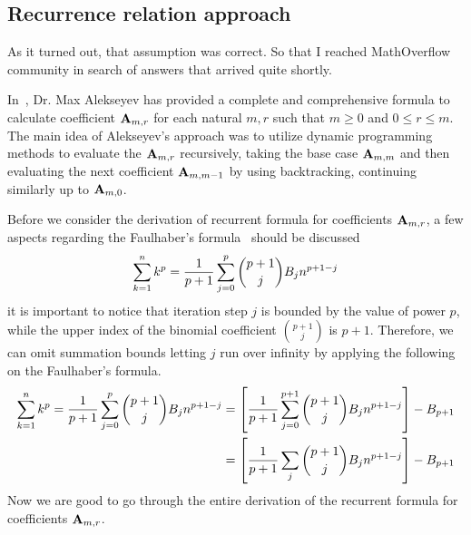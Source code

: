 \subsection{Recurrence relation approach}\label{subsec:recurrence-relation-approach}
As it turned out, that assumption was correct.
So that I reached MathOverflow community in search of answers that arrived quite shortly.

In~\cite{alekseyev2018mathoverflow}, Dr. Max Alekseyev has provided a complete and comprehensive formula to calculate
coefficient ${\mathbf{A}} \sb{m,r}$ for each natural $m,r$ such that $m\geq 0$ and $0 \leq r \leq m$.
The main idea of Alekseyev's approach was to utilize dynamic programming methods to evaluate the ${\mathbf{A}} \sb{m,r}$ recursively,
taking the base case ${\mathbf{A}} \sb{m,m}$ and then evaluating the next coefficient ${\mathbf{A}} \sb{m,m-1}$
by using backtracking, continuing similarly up to ${\mathbf{A}} \sb{m,0}$.

Before we consider the derivation of recurrent formula for coefficients ${\mathbf{A}} \sb{m,r}$,
a few aspects regarding the Faulhaber's formula~\cite{beardon1996sums} should be discussed
\begin{equation*}
    \sum_{k=1}^{n} k^{p} = \frac{1}{p+1}\sum_{j=0}^{p} \binom{p+1}{j} {B}\sb{j} n^{p+1-j}
\end{equation*}
it is important to notice that iteration step $j$ is bounded by the value of power $p$,
while the upper index of the binomial coefficient $\binom{p+1}{j}$ is $p+1$.
Therefore, we can omit summation bounds letting $j$ run over infinity by applying
the following on the Faulhaber's formula.
\begin{align*}
    \sum_{k=1}^{n} k^{p}
    = \frac{1}{p+1}\sum_{j=0}^{p} \binom{p+1}{j} {B}\sb{j} n^{p+1-j}
    &= \left[ \frac{1}{p+1}\sum_{j=0}^{p+1} \binom{p+1}{j} {B}\sb{j} n^{p+1-j} \right] - {B}\sb{p+1} \\
    &= \left[ \frac{1}{p+1}\sum_{j} \binom{p+1}{j} {B}\sb{j} n^{p+1-j} \right] - {B}\sb{p+1}
\end{align*}
Now we are good to go through the entire derivation of the recurrent formula for
coefficients ${\mathbf{A}} \sb{m,r}$.

